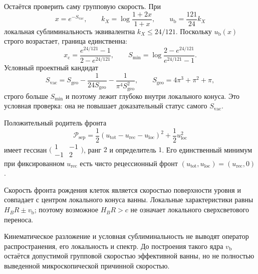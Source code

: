Остаётся проверить саму групповую скорость. При
\begin{equation}
 x=e^{-S_{\mathrm{vac}}},\qquad
 k_X=\log\frac{1+2x}{1+x},\qquad
 u_{\mathrm b}=\frac{121}{24}k_X
\end{equation}
локальная сублиминальность эквивалентна $k_X\leq24/121$. Поскольку
$u_{\mathrm b}(x)$ строго возрастает, граница единственна:
\begin{equation}
 x_{\mathrm c}
 =\frac{e^{24/121}-1}{2-e^{24/121}},
 \qquad
 S_{\min}=\log\frac{2-e^{24/121}}{e^{24/121}-1}.
 \label{eq:v10-bath-causal-threshold}
\end{equation}
Условный проектный кандидат
\begin{equation}
 S_{\mathrm{vac}}
 =S_{\mathrm{geo}}-\frac1{24S_{\mathrm{geo}}}
 -\frac1{\pi^4S_{\mathrm{geo}}^2},
 \qquad S_{\mathrm{geo}}=4\pi^3+\pi^2+\pi,
\end{equation}
строго больше $S_{\min}$ и поэтому лежит глубоко внутри локального конуса.
Это условная проверка: она не повышает доказательный статус самого
$S_{\mathrm{vac}}$.

Положительный родитель фронта
\begin{equation}
 \mathcal P_{\mathrm{sep}}
 =\frac12(u_{\mathrm{tot}}-u_{\mathrm{rec}}-u_{\mathrm{loc}})^2
 +\frac12u_{\mathrm{loc}}^2
\end{equation}
имеет гессиан
$\bigl(\begin{smallmatrix}1&-1\\-1&2\end{smallmatrix}\bigr)$,
ранг $2$ и определитель $1$. Его единственный минимум при фиксированном
$u_{\mathrm{rec}}$ есть чисто рецессионный фронт
$(u_{\mathrm{tot}},u_{\mathrm{loc}})=(u_{\mathrm{rec}},0)$.

\begin{theorem}
Скорость фронта рождения клеток является скоростью поверхности уровня и
совпадает с центром локального конуса ванны. Локальные характеристики равны
$H_BR\pm v_{\mathrm b}$; поэтому возможное $H_BR>c$ не означает локального
сверхсветового переноса.
\end{theorem}

\begin{nogocriterion}
Кинематическое разложение и условная сублиминальность не выводят оператор
распространения, его локальность и спектр. До построения такого ядра
$v_{\mathrm b}$ остаётся допустимой групповой скоростью эффективной ванны,
но не полностью выведенной микроскопической причинной скоростью.
\end{nogocriterion}

